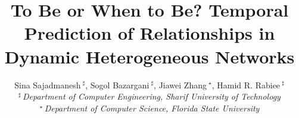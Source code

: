 \documentclass[10pt,conference,letterpaper]{IEEEtran}
\title{To Be or When to Be? Temporal Prediction of Relationships in Dynamic Heterogeneous Networks}
\author{%
{Sina Sajadmanesh{\small $~^{\sharp}$}, Sogol Bazargani{\small $~^{\sharp}$}, Jiawei Zhang{\small $~^{\star}$}, Hamid R. Rabiee{\small $~^{\sharp}$} }%
\vspace{1.6mm}\\
\fontsize{10}{10}\selectfont\itshape
$^{\sharp}$\,Department of Computer Engineering, Sharif University of Technology\\
\fontsize{9}{9}\selectfont\ttfamily\upshape
%
\vspace{1.2mm}
\fontsize{10}{10}\selectfont\rmfamily\itshape
$^{\star}$\,Department of Computer Science, Florida State University\\
\fontsize{9}{9}\selectfont\ttfamily\upshape
}
\begin{document}
\maketitle
%

\newcommand\sina[1]{\textbf{\textcolor{red}{Sina: #1}}}

\newtheorem{definition}{Definition}
\newcommand{\descr}[1]{\smallskip\noindent\textbf{#1}}
\newcommand{\npglm}{{\textsc{Np-Glm}}\xspace}
\newcommand{\mb}[1]{\mathbf{#1}}
\newcommand{\mc}[1]{\mathcal{#1}}
\newcommand\xrsquigarrow[1]{%
	\stepcounter{sarrow}%
	\begin{tikzpicture}[decoration=snake]
	\node (\thesarrow) {\strut#1};
	\draw[->,decorate] (\thesarrow.south west) -- (\thesarrow.south east);
	\end{tikzpicture}%
}
\setlength{\floatsep}{5pt}
\setlength{\textfloatsep}{5pt}
\setlength{\intextsep}{5pt}



%


%

%


%
%


\balance

\end{document}
